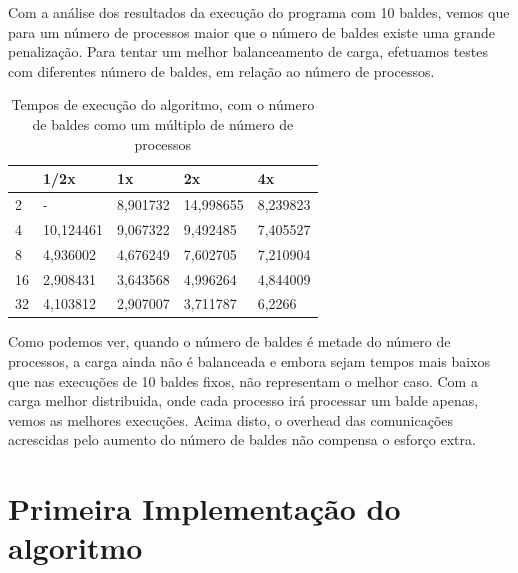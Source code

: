 \documentclass[a4paper]{report}
\begin{document}
Com a análise dos resultados da execução do programa com 10 baldes, vemos que
para um número de processos maior que o número de baldes existe uma grande
penalização. Para tentar um melhor balanceamento de carga, efetuamos testes com
diferentes número de baldes, em relação ao número de processos.

\begin{table}[h]
    \centering
    \begin{tabular}{|l|l|l|l|l|}
        \hline
   & 1/2x      & 1x       & 2x        & 4x       \\ \hline
        2  & -         & 8,901732 & 14,998655 & 8,239823 \\ \hline
        4  & 10,124461 & 9,067322 & 9,492485  & 7,405527 \\ \hline
        8  & 4,936002  & 4,676249 & 7,602705  & 7,210904 \\ \hline
        16 & 2,908431  & 3,643568 & 4,996264  & 4,844009 \\ \hline
        32 & 4,103812  & 2,907007 & 3,711787  & 6,2266   \\ \hline
    \end{tabular}
    \caption{\label{tab:varb}Tempos de execução do algoritmo, com o número de
    baldes como um múltiplo de número de processos}
\end{table}

Como podemos ver, quando o número de baldes é metade do número de processos, a
carga ainda não é balanceada e embora sejam tempos mais baixos que nas execuções
de 10 baldes fixos, não representam o melhor caso. Com a carga melhor
distribuida, onde cada processo irá processar um balde apenas, vemos as melhores
execuções. Acima disto, o overhead das comunicações acrescidas pelo aumento do
número de baldes não compensa o esforço extra.

\appendix

\chapter{Primeira Implementação do algoritmo} \label{apx:slowpar}
\end{document}
